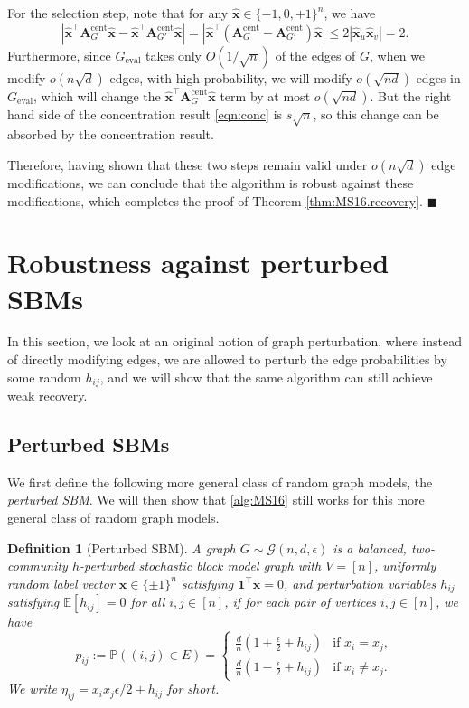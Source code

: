 \documentclass[11pt, titlepage]{article} %
\numberwithin{equation}{section}
\newtheorem{definition}{Definition}
\theoremstyle{definition}
\numberwithin{theorem}{section}
\numberwithin{lemma}{section}
\numberwithin{corollary}{section}
\numberwithin{proposition}{section}
\numberwithin{definition}{section}
\numberwithin{remark}{section}
\begin{document}
For the selection step, note that for any $\hat{\bm{x}} \in \{-1, 0, +1\}^n$, we have
\[
|\hat{\bm{x}}^\top \bm{A}_{G}^\mathrm{cent} \hat{\bm{x}} - \hat{\bm{x}}^\top \bm{A}_{G'}^\mathrm{cent} \hat{\bm{x}}|
= |\hat{\bm{x}}^\top (\bm{A}_{G}^\mathrm{cent} - \bm{A}_{G'}^\mathrm{cent}) \hat{\bm{x}}|
\leq 2 |\hat{\bm{x}}_u \hat{\bm{x}}_v| = 2.
\]
Furthermore, since $G_\mathrm{eval}$ takes only $O(1/\sqrt{n})$ of the edges of $G$, when we modify
$o(n\sqrt{d})$ edges, with high probability, we will modify $o(\sqrt{nd})$ edges in $G_\mathrm{eval}$, 
which will change the $\hat{\bm{x}}^\top \bm{A}_{G}^\mathrm{cent} \hat{\bm{x}}$ term by at most
$o(\sqrt{nd})$. But the right hand side of the concentration result \ref{eqn:conc} is $s\sqrt{n}$,
so this change can be absorbed by the concentration result.

Therefore, having shown that these two steps remain valid under $o(n\sqrt{d})$ edge modifications, 
we can conclude that the algorithm is robust against these modifications, which completes the proof 
of Theorem \ref{thm:MS16.recovery}. \hfill $\blacksquare$

\section{Robustness against perturbed SBMs}
\label{sec:perturb.robust}
In this section, we look at an original notion of graph perturbation, where instead of directly 
modifying edges, we are allowed to perturb the edge probabilities by some random $h_{ij}$, 
and we will show that the same algorithm can still achieve weak recovery.
\subsection{Perturbed SBMs}
We first define the following more general class of random graph models, the \emph{perturbed SBM}. 
We will then show that \cref{alg:MS16} still works for this more general class of random graph
models.
\begin{definition}[Perturbed SBM]
A graph $G \sim \mathcal{G}(n, d, \epsilon)$ is a balanced, two-community $h$-perturbed stochastic block model graph
with $V = [n]$, uniformly random label vector $\bm{x} \in \{\pm 1\}^n$ satisfying $\bm{1}^\top \bm{x} = 0$,
and perturbation variables $h_{ij}$ satisfying $\mathbb{E}[h_{ij}] = 0$ for all $i, j \in [n]$,
if for each pair of vertices $i, j \in [n]$, we have
\[p_{ij} := \mathbb{P}((i,j) \in E) = \begin{cases}
\frac{d}{n}(1+\frac{\epsilon}{2}+h_{ij}) & \text{if } x_i = x_j, \\
\frac{d}{n}(1-\frac{\epsilon}{2}+h_{ij}) & \text{if } x_i \neq x_j.
\end{cases}\]
We write $\eta_{ij} = x_ix_j\epsilon/2 + h_{ij}$ for short.
\end{definition}
\end{document}
